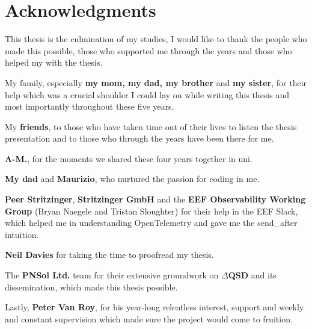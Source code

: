 \chapter*{Acknowledgments}
    This thesis is the culmination of my studies, I would like to thank the people who made this possible, those who supported me through the years and those who helped my with the thesis.
    
    \forceindent My family, especially \textbf{my mom, my dad, my brother} and \textbf{my sister}, for their help which was a crucial shoulder I could lay on while writing this thesis and most importantly throughout these five years.
    
    \forceindent My \textbf{friends}, to those who have taken time out of their lives to listen the thesis presentation and to those who through the years have been there for me. 

    \forceindent \textbf{A-M.}, for the moments we shared these four years together in uni.

    \forceindent \textbf{My dad} and \textbf{Maurizio}, who nurtured the passion for coding in me.
    
    \forceindent \textbf{Peer Stritzinger}, \textbf{Stritzinger GmbH} and the \textbf{EEF Observability Working Group} (Bryan Naegele and Tristan Sloughter) for their help in the EEF Slack, which helped me in understanding OpenTelemetry and gave me the send\_after intuition.

    \forceindent \textbf{Neil Davies} for taking the time to proofread my thesis.

    \forceindent The \textbf{PNSol Ltd.} team for their extensive groundwork on \textbf{$\Delta$QSD} and its dissemination, which made this thesis possible.

    \forceindent Lastly, \textbf{Peter Van Roy}, for his year-long relentless interest, support and weekly and constant supervision which made sure the project would come to fruition. 

